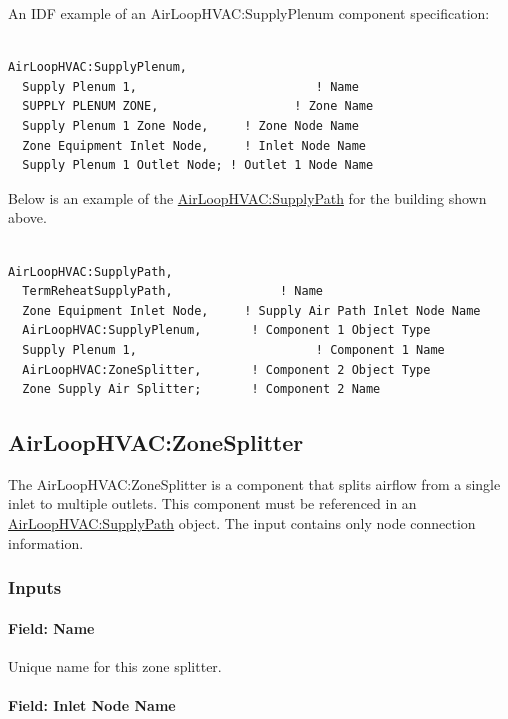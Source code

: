 An IDF example of an AirLoopHVAC:SupplyPlenum component specification:

\begin{lstlisting}

AirLoopHVAC:SupplyPlenum,
  Supply Plenum 1,                         ! Name
  SUPPLY PLENUM ZONE,                   ! Zone Name
  Supply Plenum 1 Zone Node,     ! Zone Node Name
  Zone Equipment Inlet Node,     ! Inlet Node Name
  Supply Plenum 1 Outlet Node; ! Outlet 1 Node Name
\end{lstlisting}

Below is an example of the \hyperref[airloophvacsupplypath]{AirLoopHVAC:SupplyPath} for the building shown above.

\begin{lstlisting}

AirLoopHVAC:SupplyPath,
  TermReheatSupplyPath,               ! Name
  Zone Equipment Inlet Node,     ! Supply Air Path Inlet Node Name
  AirLoopHVAC:SupplyPlenum,       ! Component 1 Object Type
  Supply Plenum 1,                         ! Component 1 Name
  AirLoopHVAC:ZoneSplitter,       ! Component 2 Object Type
  Zone Supply Air Splitter;       ! Component 2 Name
\end{lstlisting}

\subsection{AirLoopHVAC:ZoneSplitter}\label{airloophvaczonesplitter}

The AirLoopHVAC:ZoneSplitter is a component that splits airflow from a single inlet to multiple outlets. This component must be referenced in an \hyperref[airloophvacsupplypath]{AirLoopHVAC:SupplyPath} object. The input contains only node connection information.

\subsubsection{Inputs}\label{inputs-4-002}

\paragraph{Field: Name}\label{field-name-4-002}

Unique name for this zone splitter.

\paragraph{Field: Inlet Node Name}\label{field-inlet-node-name-2}

